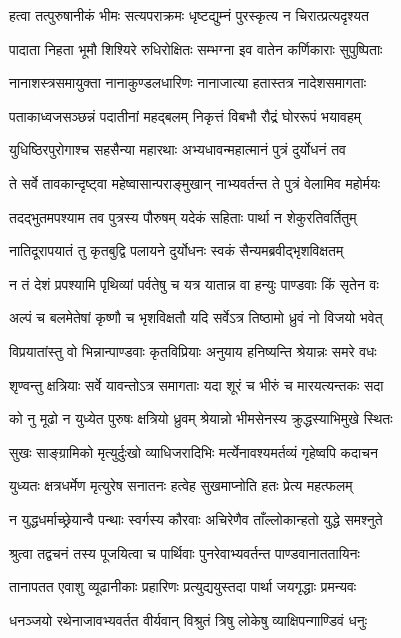 \twolineshloka
{हत्वा तत्पुरुषानीकं भीमः सत्यपराक्रमः}
{धृष्टद्युम्नं पुरस्कृत्य न चिरात्प्रत्यदृश्यत}


\twolineshloka
{पादाता निहता भूमौ शिश्यिरे रुधिरोक्षितः}
{सम्भग्ना इव वातेन कर्णिकाराः सुपुष्पिताः}


\twolineshloka
{नानाशस्त्रसमायुक्ता नानाकुण्डलधारिणः}
{नानाजात्या हतास्तत्र नादेशसमागताः}


\twolineshloka
{पताकाध्वजसञ्छन्नं पदातीनां महद्बलम्}
{निकृत्तं विबभौ रौद्रं घोररूपं भयावहम्}


\twolineshloka
{युधिष्ठिरपुरोगाश्च सहसैन्या महारथाः}
{अभ्यधावन्महात्मानं पुत्रं दुर्योधनं तव}


\twolineshloka
{ते सर्वे तावकान्दृष्ट्वा महेष्वासान्पराङ्मुखान्}
{नाभ्यवर्तन्त ते पुत्रं वेलामिव महोर्मयः}


\twolineshloka
{तदद्भुतमपश्याम तव पुत्रस्य पौरुषम्}
{यदेकं सहिताः पार्था न शेकुरतिवर्तितुम्}


\twolineshloka
{नातिदूरापयातं तु कृतबुद्वि पलायने}
{दुर्योधनः स्वकं सैन्यमब्रवीद्भृशविक्षतम्}


\twolineshloka
{न तं देशं प्रपश्यामि पृथिव्यां पर्वतेषु च}
{यत्र यातान्न वा हन्युः पाण्डवाः किं सृतेन वः}


\twolineshloka
{अल्पं च बलमेतेषां कृष्णौ च भृशविक्षतौ}
{यदि सर्वेऽत्र तिष्ठामो ध्रुवं नो विजयो भवेत्}


\twolineshloka
{विप्रयातांस्तु वो भिन्नान्पाण्डवाः कृतविप्रियाः}
{अनुयाय हनिष्यन्ति श्रेयान्नः समरे वधः}


\twolineshloka
{शृण्वन्तु क्षत्रियाः सर्वे यावन्तोऽत्र समागताः}
{यदा शूरं च भीरुं च मारयत्यन्तकः सदा}


\twolineshloka
{को नु मूढो न युध्येत पुरुषः क्षत्रियो ध्रुवम्}
{श्रेयान्नो भीमसेनस्य क्रुद्धस्याभिमुखे स्थितः}


\twolineshloka
{सुखः साङ्ग्रामिको मृत्युर्दुःखो व्याधिजरादिभिः}
{मर्त्येनावश्यमर्तव्यं गृहेष्वपि कदाचन}


\twolineshloka
{युध्यतः क्षत्रधर्मेण मृत्युरेष सनातनः}
{हत्वेह सुखमाप्नोति हतः प्रेत्य महत्फलम्}


\twolineshloka
{न युद्धधर्माच्छ्रेयान्वै पन्थाः स्वर्गस्य कौरवाः}
{अचिरेणैव ताँल्लोकान्हतो युद्धे समश्नुते}


\twolineshloka
{श्रुत्वा तद्वचनं तस्य पूजयित्वा च पार्थिवाः}
{पुनरेवाभ्यवर्तन्त पाण्डवानाततायिनः}


\twolineshloka
{तानापतत एवाशु व्यूढानीकाः प्रहारिणः}
{प्रत्युद्ययुस्तदा पार्था जयगृद्धाः प्रमन्यवः}


\twolineshloka
{धनञ्जयो रथेनाजावभ्यवर्तत वीर्यवान्}
{विश्रुतं त्रिषु लोकेषु व्याक्षिपन्गाण्डिवं धनुः}


